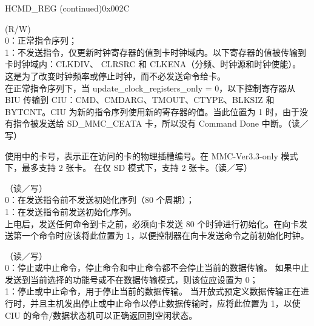 \begin{register}{H}{CMD\_REG (continued)}{0x002C}
%
%
%
%
%
%
%
%
%
%
%
%
%
%
%
%
%
%
%
%
%
%
%
\regnewline%
\begin{regdesc}\begin{reglist}
\item [UPDATE\_CLOCK\_REGISTERS\_ONLY] (R/W)\\
0：正常指令序列；\\
1：不发送指令，仅更新时钟寄存器的值到卡时钟域内。以下寄存器的值被传输到卡时钟域内：CLKDIV、 CLRSRC 和 CLKENA（分频、时钟源和时钟使能）。
这是为了改变时钟频率或停止时钟，而不必发送命令给卡。\\
在正常指令序列下，当 update\_clock\_registers\_only = 0，以下控制寄存器从 BIU 传输到 CIU：CMD、CMDARG、TMOUT、CTYPE、BLKSIZ 和 BYTCNT。CIU 为新的指令序列使用新的寄存器的值。当此位置为 1 时，由于没有指令被发送给 SD\_MMC\_CEATA 卡，所以没有 Command Done 中断。（读／写）
\item [CARD\_NUMBER]使用中的卡号，表示正在访问的卡的物理插槽编号。在 MMC-Ver3.3-only 模式下，最多支持 2 张卡。 在仅 SD 模式下，支持 2 张卡。（读／写）
\item [SEND\_INITIALIZATION] （读／写）\\
0：在发送指令前不发送初始化序列（80 个周期）；\\
1：在发送指令前发送初始化序列。\\
上电后，发送任何命令到卡之前，必须向卡发送 80 个时钟进行初始化。在向卡发送第一个命令时应该将此位置为 1，以便控制器在向卡发送命令之前初始化时钟。
\item [STOP\_ABORT\_CMD] （读／写）\\
0：停止或中止命令，停止命令和中止命令都不会停止当前的数据传输。 如果中止发送到当前选择的功能号或不在数据传输模式，则该位应设置为 0；\\
1：停止或中止命令，用于停止当前的数据传输。 当开放式预定义数据传输正在进行时，并且主机发出停止或中止命令以停止数据传输时，应将此位置为 1，以使 CIU 的命令/数据状态机可以正确返回到空闲状态。
\end{reglist}\end{regdesc}
\end{register}

